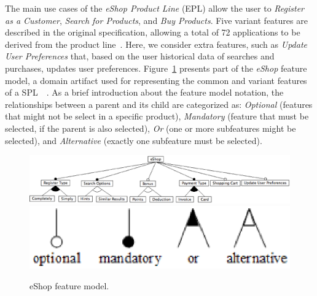\documentclass{llncs}
\begin{document}
The main use cases of the \emph{eShop Product Line} (EPL) 
allow the user to \emph{Register as a Customer}, \emph{Search for Products}, 
and \emph{Buy Products}.  Five variant features are described in the original specification,
allowing a total  of 72 applications to be derived from the product line~\cite{eshop-url}. Here, 
we consider extra features, such as \emph{Update User Preferences} that, based on the user historical data of searches 
and purchases, updates user preferences. Figure~\ref{fig:eshop-fm} presents part of the \emph{eShop} feature model, a 
domain artifact used for representing the common and variant features of a SPL~~\cite{gheyi-alloy-06,czarnecki-book,kang-foda-report}. 
As a brief introduction about the feature model notation, the relationships between a parent and its child are 
categorized as: \emph{Optional} (features that might not be select in a specific product), \emph{Mandatory} (feature that must be selected, if the parent is also 
selected), \emph{Or} (one or more subfeatures might be selected), and \emph{Alternative} (exactly one subfeature must be selected).     

 \begin{figure}[h]
 \begin{center}
  \includegraphics[scale=0.35]{img/eShop-fm3.eps}
   \includegraphics[scale=0.35]{img/fm-notation.eps}
  \caption{eShop feature model.}
  \label{fig:eshop-fm}
  \end{center}
\end{figure}


\end{document}
